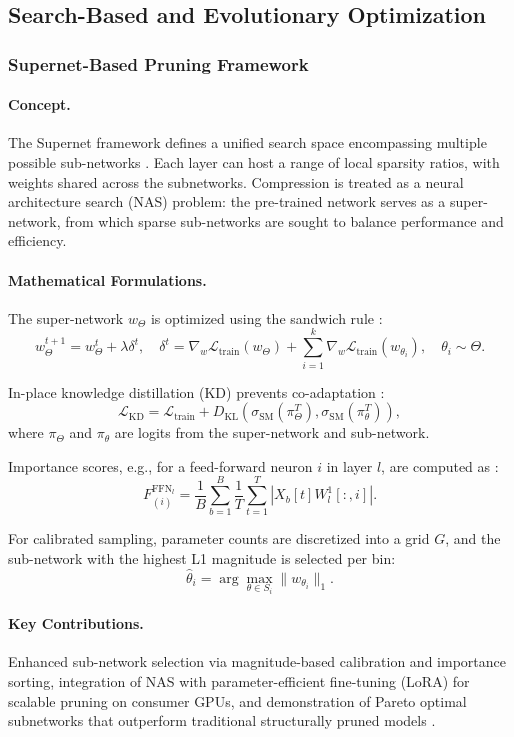 \subsection{Search-Based and Evolutionary Optimization}

\subsubsection{Supernet-Based Pruning Framework}

\paragraph{Concept.} 
The Supernet framework defines a unified search space encompassing multiple possible sub-networks \cite{Sukthanker2024}. Each layer can host a range of local sparsity ratios, with weights shared across the subnetworks. Compression is treated as a neural architecture search (NAS) problem: the pre-trained network serves as a super-network, from which sparse sub-networks are sought to balance performance and efficiency.

\paragraph{Mathematical Formulations.}
The super-network \(w_\Theta\) is optimized using the sandwich rule \cite{Yu2020}:
\[
w_{\Theta}^{t+1} = w_{\Theta}^t + \lambda \delta^t, \quad 
\delta^t = \nabla_w \mathcal{L}_{\text{train}}(w_\Theta) + \sum_{i=1}^k \nabla_w \mathcal{L}_{\text{train}}(w_{\theta_i}), \quad \theta_i \sim \Theta.
\]

In-place knowledge distillation (KD) prevents co-adaptation \cite{Hinton2015}:
\[
\mathcal{L}_{\text{KD}} = \mathcal{L}_{\text{train}} + D_{\text{KL}}\left( \sigma_{\text{SM}}(\pi_\Theta^T), \sigma_{\text{SM}}(\pi_{\theta}^T) \right),
\]
where \(\pi_\Theta\) and \(\pi_\theta\) are logits from the super-network and sub-network.

Importance scores, e.g., for a feed-forward neuron \(i\) in layer \(l\), are computed as \cite{michel2022not}:
\[
F_{(i)}^{\text{FFN}_l} = \frac{1}{B} \sum_{b=1}^B \frac{1}{T} \sum_{t=1}^T \left| X_b[t] W_l^1[:, i] \right|.
\]

For calibrated sampling, parameter counts are discretized into a grid \(G\), and the sub-network with the highest L1 magnitude is selected per bin:
\[
\hat{\theta}_i = \arg\max_{\theta \in S_i} \| w_{\theta_i} \|_1.
\]

\paragraph{Key Contributions.} 
Enhanced sub-network selection via magnitude-based calibration and importance sorting, integration of NAS with parameter-efficient fine-tuning (LoRA) for scalable pruning on consumer GPUs, and demonstration of Pareto optimal subnetworks that outperform traditional structurally pruned models \cite{Sukthanker2024}.

